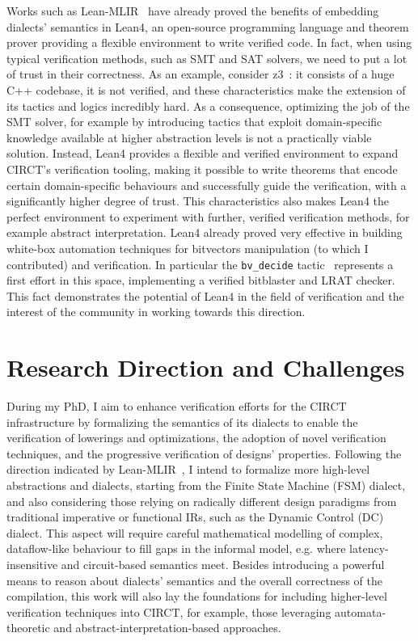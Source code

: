 \documentclass[sigconf,authorversion,nonacm, 11pt]{acmart}
\begin{document}
Works such as Lean-MLIR~\cite{bhat2024verifying} have already proved the benefits 
of embedding dialects' semantics in Lean4, an open-source programming language and theorem prover providing a flexible environment to write verified code. 
In fact, when using typical verification methods, such as SMT and SAT solvers, we need to put a lot of trust in their correctness. 
As an example, consider z3~\cite{de2008z3}: it consists of a huge C++ codebase, it is not verified, and these characteristics make the extension
of its tactics and logics incredibly hard. 
As a consequence, optimizing the job of the SMT solver, for example by introducing tactics that exploit domain-specific knowledge available at 
higher abstraction levels is not a practically viable solution. 
Instead, Lean4 provides a flexible and verified environment to expand CIRCT's verification tooling, 
making it possible to write theorems that encode certain domain-specific behaviours and successfully guide the verification, 
with a significantly higher degree of trust. 
This characteristics also makes Lean4 the perfect environment to experiment with further, verified verification 
methods, for example abstract interpretation.
Lean4 already proved very effective in building white-box automation techniques for bitvectors manipulation (to which I contributed)
and verification. 
In particular the \texttt{bv\_decide} tactic~\cite{bvdecide} represents a first effort in this space, implementing a verified bitblaster and 
LRAT checker. 
This fact demonstrates the potential of Lean4 in the field of verification and the interest of the community in working towards this direction. 

\section{Research Direction and Challenges}

During my PhD, I aim to enhance verification efforts for the CIRCT infrastructure by formalizing the semantics of its dialects 
to enable the verification of lowerings and optimizations, the adoption of novel verification techniques, 
and the progressive verification of designs' properties. 
Following the direction indicated by Lean-MLIR~\cite{bhat2024verifying}, I intend to formalize more high-level abstractions and dialects, 
starting from the Finite State Machine (FSM) dialect, and also considering those relying on radically different design paradigms 
from traditional imperative or functional IRs, such as the Dynamic Control (DC) dialect. 
This aspect will require careful mathematical modelling of complex, dataflow-like behaviour to fill gaps in the informal model, e.g. where latency-insensitive and 
circuit-based semantics meet. 
Besides introducing a powerful means to reason about dialects' semantics and the overall correctness of the compilation, 
this work will also lay the foundations for including higher-level verification techniques into CIRCT, for example, those leveraging automata-theoretic 
and abstract-interpretation-based approaches. 
\end{document}
